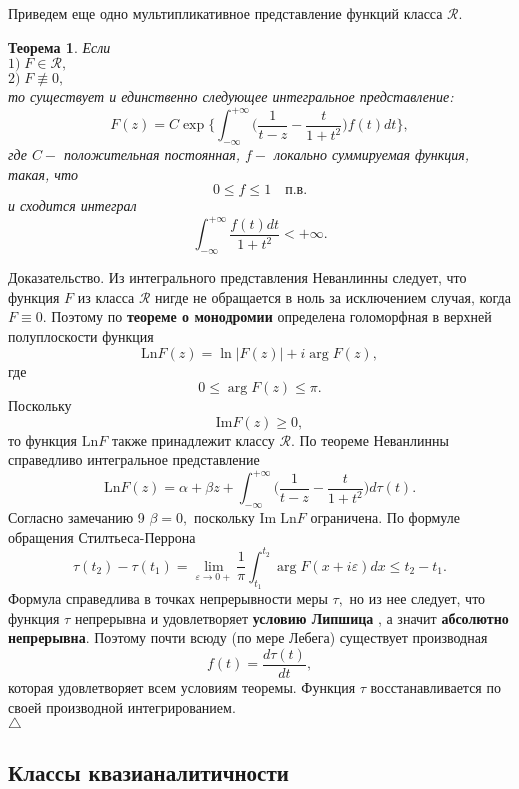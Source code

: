 \documentclass[12pt,a4paper]{article}
\theoremstyle{plain}   \newtheorem{Pro}{Задача}
\newtheorem{The}{Теорема}
\begin{document}
Приведем еще одно мультипликативное представление функций класса
$ \mathcal{R} . $
\begin{The}
Если\\
$ 1) \; F \in \mathcal{R} , $ \\
$ 2) \; F \not \equiv 0 , $ \\
то существует и единственно следующее интегральное представление:
$$
  F(z)=C \exp \Biggl \{ \int _{-\infty}^{+\infty}
  \biggl ( \frac{1}{t-z}-\frac{t}{1+t^2} \biggr )
  f(t)dt \Biggr \} ,
$$
где
$ C - $
положительная постоянная,
$ f - $
локально суммируемая функция, такая, что
$$
  0 \leq f \leq 1 \quad п.в.
$$
и сходится интеграл
$$
  \int _{-\infty}^{+\infty}
  \frac{f(t)dt}{1+t^2} < +\infty .
$$
\end{The}
{\Large Доказательство.}
Из интегрального представления Неванлинны следует, что функция
$ F $
из класса
$ \mathcal{R} $
нигде не обращается в ноль за исключением случая, когда
$ F \equiv 0. $
Поэтому по
{\bfseries теореме о монодромии}
определена голоморфная в верхней полуплоскости функция
$$
  \mathrm{Ln} F(z)= \ln |F(z)|+i \arg F(z),
$$
где
$$
  0 \leq \arg F(z) \leq \pi .
$$
Поскольку
$$
  \mathrm{Im} F(z) \geq 0,
$$
то функция
$ \mathrm{Ln} F $
также принадлежит классу
$ \mathcal{R} . $
По теореме Неванлинны справедливо интегральное представление
$$
  \mathrm{Ln} F(z)= \alpha +\beta z + \int _{-\infty}^{+\infty}
  \biggl ( \frac{1}{t-z}-\frac{t}{1+t^2} \biggr )
  d\tau (t) .
$$
Согласно замечанию 9
$ \beta =0, $
поскольку
$ \mathrm{Im \; Ln} F $
ограничена.
По формуле обращения Стилтьеса-Перрона
$$
  \tau (t_2 )-\tau (t_1 )=\lim _{\varepsilon \rightarrow 0+}
  \frac{1}{\pi} \int _{t_1}^{t_2}
  \arg F(x+i \varepsilon )dx \leq t_2 -t_1 .
$$
Формула справедлива в точках непрерывности меры
$ \tau , $
но из нее следует, что функция
$ \tau $
непрерывна и удовлетворяет
{\bfseries условию Липшица}
, а значит
{\bfseries абсолютно непрерывна}.
Поэтому почти всюду (по мере Лебега) существует производная
$$
  f(t)=\frac{d\tau (t)}{dt},
$$
которая удовлетворяет всем условиям теоремы. Функция
$ \tau $
восстанавливается по своей производной интегрированием.
\\
$ \triangle $
\newpage
\subsection{Классы квазианалитичности}
$ \; $
\\
\end{document}
